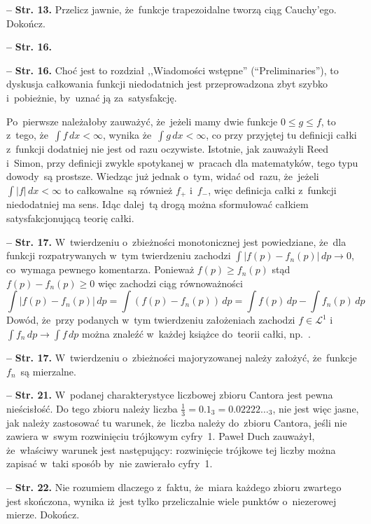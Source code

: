 \documentclass[a4paper,11pt]{article}
\newcommand{\ld}{\ldots}
\newcommand{\fr}{\frac}
\newcommand{\mc}{\mathcal}
\newcommand{\ra}{\rightarrow}
\newcommand{\Lc}{\mc{L}}
\newcommand{\dk}{\, d} %
\newcommand{\Int}{\int\limits}
\newcommand{\IntCaD}[2] { \Int #1 \, d#2 } %
\newcommand{\LcIj}{\Lc^{ 1 }}
\providecommand{\absj}[1]{\lvert #1 \rvert}
\newcommand{\tb}{\textbf}
\newcommand{\noi}{\noindent}
\newcommand{\start}{\noi \tb{--} {}}
\newcommand{\Str}[1]{\tb{Str. #1.}}
\newcommand{\Dok}{{\color{red} Dokończ.}}
\begin{document}
\start \Str{13} Przelicz jawnie, że~funkcje trapezoidalne tworzą ciąg
Cauchy'ego. \Dok

\start \Str{16}

\start \Str{16} Choć jest to rozdział ,,Wiadomości wstępne''
(``Preliminaries''), to dyskusja całkowania funkcji niedodatnich jest
przeprowadzona zbyt szybko i~pobieżnie, by~uznać ją za~satysfakcję.

Po~pierwsze należałoby zauważyć, że~jeżeli mamy dwie funkcje
$0 \leq g \leq f$, to z~tego, że~$\IntCaD{ f }{ x } < \infty$, wynika
że~$\IntCaD{ g }{ x } < \infty$, co przy przyjętej tu definicji całki
z~funkcji dodatniej nie jest od razu oczywiste. Istotnie, jak
zauważyli Reed i~Simon, przy definicji zwykle spotykanej w~pracach dla
matematyków, tego typu dowody~są prostsze. Wiedząc już jednak o~tym,
widać od~razu, że~jeżeli $\IntCaD{ \absj{ f } }{ x } < \infty$ to
całkowalne~są również $f_{ + }$ i~$f_{ - }$, więc definicja całki
z~funkcji niedodatniej ma sens. Idąc dalej~tą drogą można sformułować
całkiem satysfakcjonującą teorię całki.

\start \Str{17} W~twierdzeniu o~zbieżności monotonicznej jest
powiedziane, że~dla funkcji rozpatrywanych w~tym twierdzeniu zachodzi
$\int | f( p ) - f_{ n }( p ) | \dk p \ra 0$, co~wymaga pewnego
komentarza. Ponieważ $f( p ) \geq f_{ n }( p )$ stąd
$f( p ) - f_{ n }( p ) \geq 0$ więc zachodzi ciąg równoważności
\begin{displaymath}
  \IntCaD{ | f( p ) - f_{ n }( p ) | }{ p } = \IntCaD{ ( f( p )
    - f_{ n }( p ) ) }{ p } = \IntCaD{ f( p ) }{ p }
  - \IntCaD{ f_{ n }( p ) }{ p }
\end{displaymath}
Dowód, że~przy podanych w~tym twierdzeniu założeniach zachodzi
$f \in \LcIj$ i~$\IntCaD{ f_{ n } }{ p } \ra \IntCaD{ f }{ p }$ można
znaleźć w~każdej książce do~teorii całki, np.~\cite{Rudin98}.

\start \Str{17} W~twierdzeniu o~zbieżności majoryzowanej należy
założyć, że~funkcje $f_{ n }$~są mierzalne.

\start \Str{21} W~podanej charakterystyce liczbowej zbioru Cantora
jest pewna nieścisłość. Do tego zbioru należy liczba
$\fr{ 1 }{ 3 } = 0.1_{ 3 } = 0.02222\ld_{ 3 }$, nie jest więc jasne,
jak należy zastosować tu warunek, że~liczba należy do~zbioru Cantora,
jeśli nie zawiera w~swym rozwinięciu trójkowym cyfry~1. Paweł Duch
zauważył, że~właściwy warunek jest następujący: rozwinięcie trójkowe
tej liczby można zapisać w~taki sposób by~nie zawierało cyfry~1.

\start \Str{22} Nie rozumiem dlaczego z~faktu, że~miara każdego zbioru
zwartego jest skończona, wynika iż~jest tylko przeliczalnie wiele
punktów o~niezerowej mierze. \Dok
\end{document}
